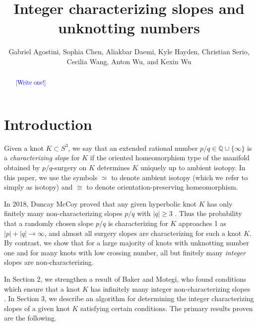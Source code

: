 \documentclass[11pt,usenames,dvipsnames,reqno]{amsart}
\numberwithin{theorem}{section}
\theoremstyle{ex}
\theoremstyle{rem}
\def\kh#1{\textcolor{Blue}{#1}}
\begin{document}


\title{Integer characterizing slopes and unknotting numbers}

\author[Agostini, Chen, Daemi, Hayden, Serio, Wang, A. Wu, and K. Wu]{Gabriel Agostini, Sophia Chen, Aliakbar Daemi, Kyle Hayden, Christian Serio, Cecilia Wang, Anton Wu, and Kexin Wu}



\begin{abstract} 
\kh{[Write one!]}
\end{abstract}


\maketitle

\section{Introduction}\label{sec:intro}

Given a knot $K\subset S^3$, we say that an extended rational number $p/q\in\mathbb{Q}\cup\{\infty\}$ is a {\it characterizing slope} for $K$ if the oriented homeomorphism type of the manifold obtained by $p/q$-surgery on $K$ determines $K$ uniquely up to ambient isotopy. In this paper, we use the symbols $\simeq$ to denote ambient isotopy (which we refer to simply as isotopy) and $\cong$ to denote orientation-preserving homeomorphism. 

In 2018, Duncay McCoy proved that any given hyperbolic knot $K$ has only finitely many non-characterizing slopes $p/q$ with $|q|\geq 3$ \cite{mccoy:hyperbolic}. Thus the probability that a randomly chosen slope $p/q$ is characterizing for $K$ approaches 1 as $|p|+|q|\to\infty$, and almost all surgery slopes are characterizing for such a knot $K$. By contrast, we show that for a large majority of knots with unknotting number one and for many knots with low crossing number, all but finitely many \textit{integer} slopes are non-characterizing.

In Section 2, we strengthen a result of Baker and Motegi, who found conditions which ensure that a knot $K$ has infinitely many integer non-characterizing slopes \cite{baker-motegi}. In Section 3, we describe an algorithm for determining the integer characterizing slopes of a given knot $K$ satisfying certain conditions. The primary results proven are the following.
\end{document}
